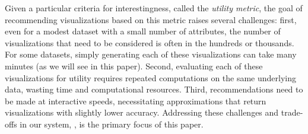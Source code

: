 

Given a particular criteria for interestingness, called the {\em utility metric},
the goal of recommending visualizations based on this metric 
raises several challenges:
first, even for a modest dataset with a small number
of attributes, the number of  
visualizations that need to be considered is often in the hundreds or thousands.
For some datasets, simply generating each of these visualizations can take many minutes 
(as we will see in this paper).
Second, evaluating each of these visualizations for utility requires repeated
computations on the same underlying data, wasting time and computational resources.
Third, recommendations need to be made at interactive speeds,
necessitating approximations that return visualizations with slightly lower accuracy. 
Addressing these challenges and trade-offs in our system, \SeeDB, 
is the primary focus of this paper. 






